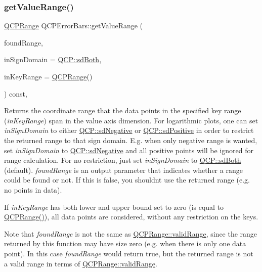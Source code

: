 \subsubsection{\texorpdfstring{get\+Value\+Range()}{getValueRange()}}
{\footnotesize\ttfamily \hyperlink{classQCPRange}{Q\+C\+P\+Range} Q\+C\+P\+Error\+Bars\+::get\+Value\+Range (\begin{DoxyParamCaption}\item[{bool \&}]{found\+Range,  }\item[{\hyperlink{namespaceQCP_afd50e7cf431af385614987d8553ff8a9}{Q\+C\+P\+::\+Sign\+Domain}}]{in\+Sign\+Domain = {\ttfamily \hyperlink{namespaceQCP_afd50e7cf431af385614987d8553ff8a9aa38352ef02d51ddfa4399d9551566e24}{Q\+C\+P\+::sd\+Both}},  }\item[{const \hyperlink{classQCPRange}{Q\+C\+P\+Range} \&}]{in\+Key\+Range = {\ttfamily \hyperlink{classQCPRange}{Q\+C\+P\+Range}()} }\end{DoxyParamCaption}) const\hspace{0.3cm}{\ttfamily [protected]}, {\ttfamily [virtual]}}

Returns the coordinate range that the data points in the specified key range ({\itshape in\+Key\+Range}) span in the value axis dimension. For logarithmic plots, one can set {\itshape in\+Sign\+Domain} to either \hyperlink{namespaceQCP_afd50e7cf431af385614987d8553ff8a9a2d18af0bc58f6528d1e82ce699fe4829}{Q\+C\+P\+::sd\+Negative} or \hyperlink{namespaceQCP_afd50e7cf431af385614987d8553ff8a9a584784b75fb816abcc627cf743bb699f}{Q\+C\+P\+::sd\+Positive} in order to restrict the returned range to that sign domain. E.\+g. when only negative range is wanted, set {\itshape in\+Sign\+Domain} to \hyperlink{namespaceQCP_afd50e7cf431af385614987d8553ff8a9a2d18af0bc58f6528d1e82ce699fe4829}{Q\+C\+P\+::sd\+Negative} and all positive points will be ignored for range calculation. For no restriction, just set {\itshape in\+Sign\+Domain} to \hyperlink{namespaceQCP_afd50e7cf431af385614987d8553ff8a9aa38352ef02d51ddfa4399d9551566e24}{Q\+C\+P\+::sd\+Both} (default). {\itshape found\+Range} is an output parameter that indicates whether a range could be found or not. If this is false, you shouldn\textquotesingle{}t use the returned range (e.\+g. no points in data).

If {\itshape in\+Key\+Range} has both lower and upper bound set to zero (is equal to {\ttfamily \hyperlink{classQCPRange}{Q\+C\+P\+Range()}}), all data points are considered, without any restriction on the keys.

Note that {\itshape found\+Range} is not the same as \hyperlink{classQCPRange_ab38bd4841c77c7bb86c9eea0f142dcc0}{Q\+C\+P\+Range\+::valid\+Range}, since the range returned by this function may have size zero (e.\+g. when there is only one data point). In this case {\itshape found\+Range} would return true, but the returned range is not a valid range in terms of \hyperlink{classQCPRange_ab38bd4841c77c7bb86c9eea0f142dcc0}{Q\+C\+P\+Range\+::valid\+Range}.

